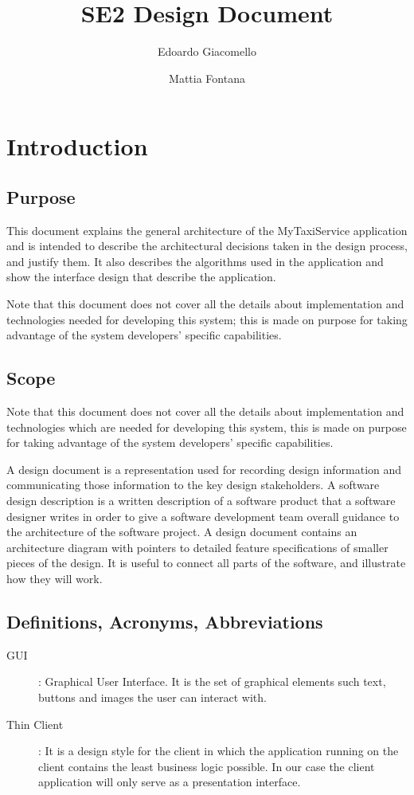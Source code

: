 \documentclass[11pt, a4paper,titlepage]{article}
\author{Edoardo Giacomello \and Mattia Fontana}
\title{SE2 Design Document}
\newcommand{\productname}{MyTaxiService }
\begin{document}
\maketitle
\tableofcontents
\newpage
\section{Introduction}
\subsection{Purpose}
This document explains the general architecture of the \productname application and is intended to describe the architectural decisions taken in the design process, and justify them.
It also describes the algorithms used in the application and show the interface design that describe the application.

	Note that this document does not cover all the details about implementation and technologies needed for developing this system; this is made on purpose for taking advantage of the system developers' specific capabilities.
\subsection{Scope}
	Note that this document does not cover all the details about implementation and technologies which are needed for developing this system, this is made on purpose for taking advantage of the system developers' specific capabilities.
	
	A design document is a representation used for recording design information and communicating those information to the key design stakeholders.
	A software design description is a written description of a software product that a software designer writes in order to give a software development team overall guidance to the architecture of the software project. A design document contains an architecture diagram with pointers to detailed feature specifications of smaller pieces of the design. 
	It is useful to connect all parts of the software, and illustrate how they will work.
	 
\subsection{Definitions, Acronyms, Abbreviations}
\begin{description}
	\item[GUI]: Graphical User Interface. It is the set of graphical elements such text, buttons and images the user can interact with.
	\item[Thin Client]: It is a design style for the client in which the application running on the client contains the least business logic possible. In our case the client application will only serve as a presentation interface.
\end{description}
\end{document}
